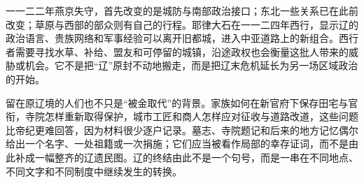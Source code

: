 一一二二年燕京失守，首先改变的是城防与南部政治接口；东北一些关系已在此前改变；草原与西部的部众则有自己的行程。耶律大石在一一二四年西行，显示辽的政治语言、贵族网络和军事经验可以离开旧都城，进入中亚道路上的新组合。西行者需要寻找水草、补给、盟友和可停留的城镇，沿途政权也会衡量这批人带来的威胁或机会。它不是把“辽”原封不动地搬走，而是把辽末危机延长为另一场区域政治的开始。

留在原辽境的人们也不只是“被金取代”的背景。家族如何在新官府下保存田宅与官衔，寺院怎样重新取得保护，城市工匠和商人怎样应对征收与道路改道，这些问题比帝纪更难回答，因为材料很少逐户记录。墓志、寺院题记和后来的地方记忆偶尔给出一个名字、一处祖籍或一次捐施；它们应当被看作局部的幸存证词，而不是由此补成一幅整齐的辽遗民图。辽的终结由此不是一个句号，而是一串在不同地点、不同文字和不同制度中继续发生的转换。


